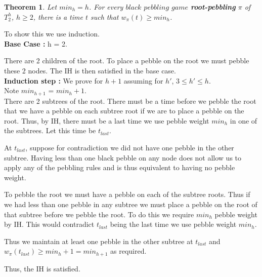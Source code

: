 \documentclass[12pt]{article}
\newtheorem{theorem}{Theorem}[subsection]
\begin{document}
\begin{theorem}\label{bplb}
Let $min_h = h$.
For every $black$ $pebbling$ $game$ {\bf root-pebbling} $\pi$ of $T^h_2$, $h \geq 2$, there is a time $t$ such
that $w_\pi(t) \ge min_h$.
\end{theorem}

\noindent
To show this we use induction.\\







\noindent
{\bf Base Case :} h = 2.

There are 2 children of the root. To place a pebble on the root we must pebble these 2 nodes. The IH is then satisfied in the base case.\\


\noindent
{\bf Induction step :} We prove for $h+1$ assuming for $h'$,
$3\le h' \le h$.\\
Note $min_{h+1}$ = $min_h + 1$.\\

There are 2 subtrees of the root. There must be a time before we pebble the root that we have a pebble on each subtree root if we are to place a pebble on the root. Thus, by IH, there must be a last time we use pebble weight $min_h$ in one of the subtrees. Let this time be $t_{last}$. 

At $t_{last}$, suppose for contradiction we did not have one pebble in the other subtree.  Having less than one black pebble on any node does not allow us to apply any of the pebbling rules and is thus equivalent to having no pebble weight.

To pebble the root we must have a pebble on each of the subtree roots. Thus if we had less than one pebble in any subtree we must place a pebble on the root of that subtree before we pebble the root. To do this we require $min_h$ pebble weight by IH. This would contradict $t_{last}$ being the last time we use pebble weight $min_h$.

Thus we maintain at least one pebble in the other subtree at $t_{last}$ and $w_\pi(t_{last}) \geq min_h + 1 = min_{h + 1}$ as required.

Thus, the IH is satisfied.\\
\end{document}
